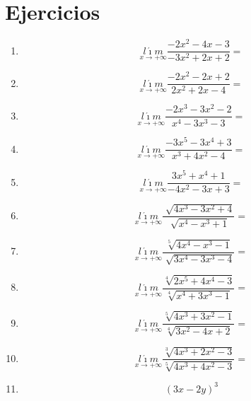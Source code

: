 \documentclass[oneside,spanish,letter]{article}
\begin{document}
\section{Ejercicios}
\begin{enumerate}
 \item $$\underset{x\rightarrow +\infty}{l\acute{\imath}m} \frac{-2x^2-4x-3}{-3x^2+2x+2}=$$
 \item $$\underset{x\rightarrow +\infty}{l\acute{\imath}m} \frac{-2x^2-2x+2}{2x^2+2x-4}=$$
 \item $$\underset{x\rightarrow +\infty}{l\acute{\imath}m} \frac{-2x^3-3x^2-2}{x^4-3x^3-3}=$$
 \item $$\underset{x\rightarrow +\infty}{l\acute{\imath}m} \frac{-3x^5-3x^4+3}{x^3+4x^2-4}=$$
 \item $$\underset{x\rightarrow +\infty}{l\acute{\imath}m} \frac{3x^5+x^4+1}{-4x^2-3x+3}=$$
 \item $$\underset{x\rightarrow +\infty}{l\acute{\imath}m} \frac{\sqrt[]{4x^3-3x^2+4}}{\sqrt[]{x^4-x^3+1}}=$$
 \item $$\underset{x\rightarrow +\infty}{l\acute{\imath}m} \frac{\sqrt[5]{4x^4-x^3-1}}{\sqrt[]{3x^4-3x^3-4}}=$$
 \item $$\underset{x\rightarrow +\infty}{l\acute{\imath}m} \frac{\sqrt[4]{2x^5+4x^4-3}}{\sqrt[4]{x^4+3x^3-1}}=$$
 \item $$\underset{x\rightarrow +\infty}{l\acute{\imath}m} \frac{\sqrt[5]{4x^3+3x^2-1}}{\sqrt[4]{3x^2-4x+2}}=$$
 \item $$\underset{x\rightarrow +\infty}{l\acute{\imath}m} \frac{\sqrt[3]{4x^3+2x^2-3}}{\sqrt[5]{4x^3+4x^2-3}}=$$
\item $$(3x-2y)^3$$
 \end{enumerate}
  \newpage
\end{document}
